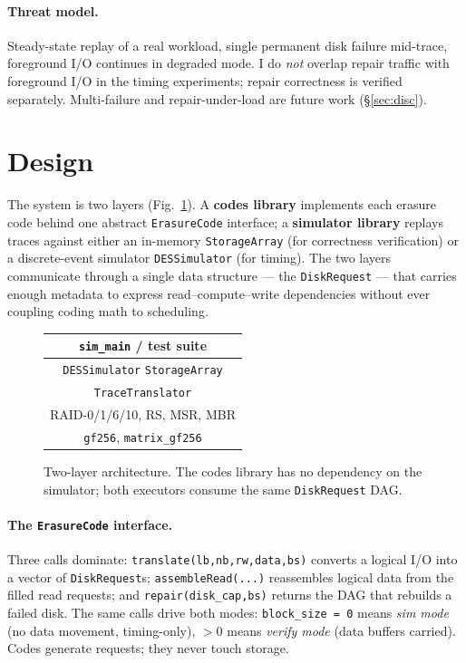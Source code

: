 \documentclass[letterpaper,twocolumn,10pt]{article}
\begin{document}
\paragraph{Threat model.}
Steady-state replay of a real workload, single permanent disk failure
mid-trace, foreground I/O continues in degraded mode. I do \emph{not}
overlap repair traffic with foreground I/O in the timing experiments;
repair correctness is verified separately. Multi-failure and
repair-under-load are future work (\S\ref{sec:disc}).

\section{Design}
\label{sec:design}

The system is two layers (Fig.~\ref{fig:arch}). A \textbf{codes library}
implements each erasure code behind one abstract \texttt{ErasureCode}
interface; a \textbf{simulator library} replays traces against either an
in-memory \texttt{StorageArray} (for correctness verification) or a
discrete-event simulator \texttt{DESSimulator} (for timing). The two layers
communicate through a single data structure --- the \texttt{DiskRequest} ---
that carries enough metadata to express read--compute--write dependencies
without ever coupling coding math to scheduling.

\begin{figure}[t]
  \centering\small
  \begin{tabular}{|c|}
  \hline
  \texttt{sim\_main} \quad / \quad test suite \\
  \hline
  \texttt{DESSimulator} \quad \texttt{StorageArray} \\
  \texttt{TraceTranslator} \\
  \hline
  RAID-0/1/6/10, RS, MSR, MBR \\
  \texttt{gf256}, \texttt{matrix\_gf256} \\
  \hline
  \end{tabular}
  \caption{Two-layer architecture. The codes library has no dependency on
  the simulator; both executors consume the same \texttt{DiskRequest} DAG.}
  \label{fig:arch}
\end{figure}

\paragraph{The \texttt{ErasureCode} interface.} Three calls dominate:
\texttt{translate(lb,nb,rw,data,bs)} converts a logical I/O into a vector of
\texttt{DiskRequest}s; \texttt{assembleRead(...)} reassembles logical data
from the filled read requests; and \texttt{repair(disk\_cap,bs)} returns the
DAG that rebuilds a failed disk. The same calls drive both modes:
\texttt{block\_size = 0} means \emph{sim mode} (no data movement,
timing-only), $>0$ means \emph{verify mode} (data buffers carried). Codes
generate requests; they never touch storage.
\end{document}
